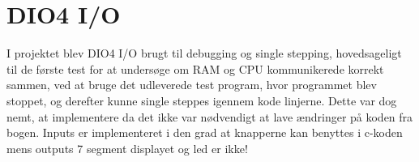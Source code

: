 \section{DIO4 I/O}
I projektet blev DIO4 I/O brugt til debugging og single stepping, hovedsageligt til de første test for at undersøge om RAM og CPU kommunikerede korrekt sammen, ved at bruge det udleverede test program, hvor programmet blev stoppet, og derefter kunne single steppes igennem kode linjerne. Dette var dog nemt, at implementere da det ikke var nødvendigt at lave ændringer på koden fra bogen. %
Inputs er implementeret i den grad at knapperne kan benyttes i c-koden mens outputs 7 segment displayet og led er ikke!